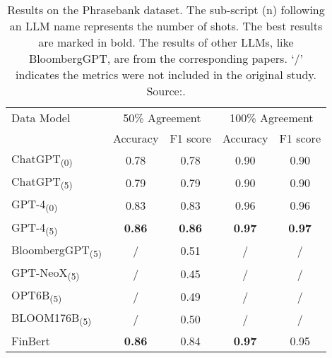 \begin{table}[!h]
	\centering
	\begin{tabularx}{0.8\textwidth}{Xcccc}
		\toprule
		Data Model                      & \multicolumn{2}{c}{50\% Agreement} & \multicolumn{2}{c}{100\% Agreement}                                 \\
		                                & Accuracy                           & F1 score                            & Accuracy      & F1 score      \\
		\midrule
		ChatGPT\textsubscript{(0)}      & 0.78                               & 0.78                                & 0.90          & 0.90          \\
		ChatGPT\textsubscript{(5)}      & 0.79                               & 0.79                                & 0.90          & 0.90          \\
		GPT-4\textsubscript{(0)}        & 0.83                               & 0.83                                & 0.96          & 0.96          \\
		GPT-4\textsubscript{(5)}        & \textbf{0.86}                      & \textbf{0.86}                       & \textbf{0.97} & \textbf{0.97} \\
		BloombergGPT\textsubscript{(5)} & /                                  & 0.51                                & /             & /             \\
		GPT-NeoX\textsubscript{(5)}     & /                                  & 0.45                                & /             & /             \\
		OPT6B\textsubscript{(5)}        & /                                  & 0.49                                & /             & /             \\
		BLOOM176B\textsubscript{(5)}    & /                                  & 0.50                                & /             & /             \\
		FinBert                         & \textbf{0.86}                      & 0.84                                & \textbf{0.97} & 0.95          \\
		\bottomrule
	\end{tabularx}
	\caption{Results on the Phrasebank dataset. The sub-script (n) following an LLM name represents the number of shots. The best results are marked in bold. The results of other LLMs, like BloombergGPT, are from the corresponding papers. ‘/’ indicates the metrics were not included in the original study. Source:\textcite{li2023chatgpt}.}
	\label{tab:finllm_comparison}
\end{table}
